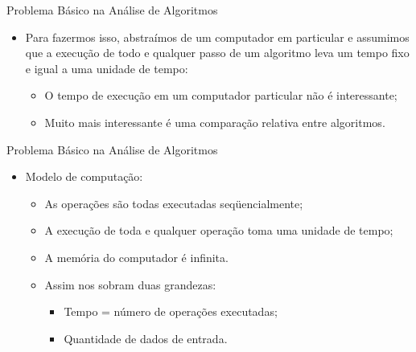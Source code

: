 \documentclass[12pt,table,xcolor={dvipsnames}]{beamer}
\begin{document}
\begin{frame}[fragile]{Problema Básico na Análise de Algoritmos}
\begin{itemize}
\item Para fazermos isso, abstraímos de um computador em particular e assumimos que a execução de todo e qualquer passo de um algoritmo leva um tempo fixo e igual a uma unidade de tempo:
\begin{itemize}
\item O tempo de execução em um computador particular não é interessante;
\item Muito mais interessante é uma comparação relativa entre algoritmos.
\end{itemize}
\end{itemize}
\end{frame}

\begin{frame}[fragile]{Problema Básico na Análise de Algoritmos}
\begin{itemize}
\item Modelo de computação: 
\begin{itemize}
\item As operações são todas executadas seqüencialmente;
\item A execução de toda e qualquer operação toma uma unidade de tempo;
\item A memória do computador é infinita.
\item Assim nos sobram duas grandezas:
\begin{itemize}
\item Tempo = número de operações executadas;
\item Quantidade de dados de entrada.
\end{itemize}
\end{itemize}
\end{itemize}
\end{frame}
\end{document}

